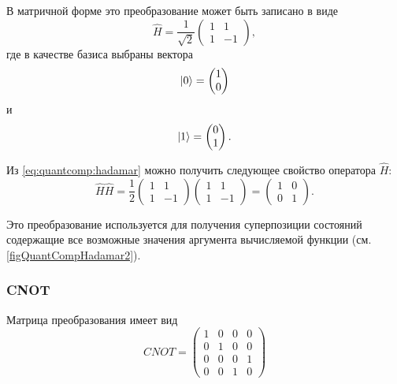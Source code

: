 В матричной форме это преобразование может быть записано в виде
\begin{equation}
\hat{H} = \frac{1}{\sqrt{2}}
\begin{pmatrix}
1 & 1 \\
1 & -1
\end{pmatrix},
\label{eq:quantcomp:hadamar}
\end{equation}
где в качестве базиса выбраны вектора
\[
\ket{0} = \begin{pmatrix}
1 \\ 0 
\end{pmatrix}
\]
и
\[
\ket{1} = \begin{pmatrix}
0 \\ 1 
\end{pmatrix}.
\]



Из \eqref{eq:quantcomp:hadamar} можно получить следующее свойство
оператора $\hat{H}$:
\begin{equation}
\hat{H} \hat{H} = \frac{1}{2}
\begin{pmatrix}
1 & 1 \\
1 & -1
\end{pmatrix}
\begin{pmatrix}
1 & 1 \\
1 & -1
\end{pmatrix} = 
\begin{pmatrix}
1 & 0 \\
0 & 1
\end{pmatrix}.
\label{eq:quantcomp:hadamar_prop}
\end{equation}

Это преобразование используется для получения суперпозиции состояний
содержащие все возможные значения аргумента вычисляемой функции
(см. \autoref{figQuantCompHadamar2}). 




\subsubsection{CNOT}

Матрица преобразования имеет вид
\[
CNOT=\begin{pmatrix}
1 & 0 & 0 & 0 \\
0 & 1 & 0 & 0 \\
0 & 0 & 0 & 1 \\
0 & 0 & 1 & 0 
\end{pmatrix}
\]

